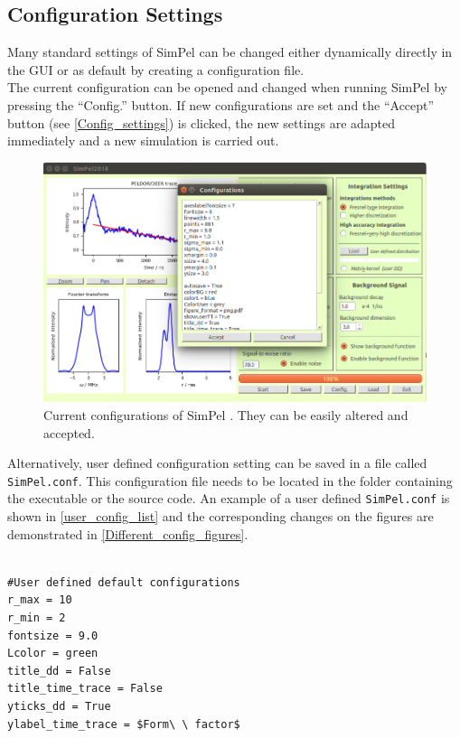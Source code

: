 \documentclass[pdftex,bezier,german,a4,twoside, headexclude,12pt,nochapterprefix, titlepage]{extarticle}
\newcommand{\simpel}{\textsf{SimPel} }
\begin{document}
\subsection{Configuration Settings}
Many standard settings of \simpel can be changed either dynamically directly in the GUI or as default by creating a
configuration file.\\
The current configuration can be opened and changed when running  \simpel by pressing the ``Config.'' button.
If new configurations are set and the ``Accept'' button (see \autoref{Config_settings})
is clicked, the new settings are adapted immediately and a new simulation is carried out.
\begin{figure}[!htb]
\centering
\includegraphics[scale=0.5]{Config_example.png}
    \caption{Current configurations of  \simpel. They can be easily altered and accepted.}
   \label{Config_settings}
\end{figure}
Alternatively, user defined configuration setting can be saved in a file called \texttt{SimPel.conf}. This configuration file
needs to be located in the folder containing the executable or the source code. An example of a user defined \texttt{SimPel.conf} is
shown in \autoref{user_config_list} and the corresponding changes on the figures are demonstrated in \autoref{Different_config_figures}.
\newpage
\begin{lstlisting}[caption={Example for a user defined configuration file (\texttt{SimPel.conf}).},label = user_config_list]

#User defined default configurations 
r_max = 10
r_min = 2
fontsize = 9.0
Lcolor = green
title_dd = False
title_time_trace = False
yticks_dd = True
ylabel_time_trace = $Form\ \ factor$
\end{lstlisting}
\end{document}

